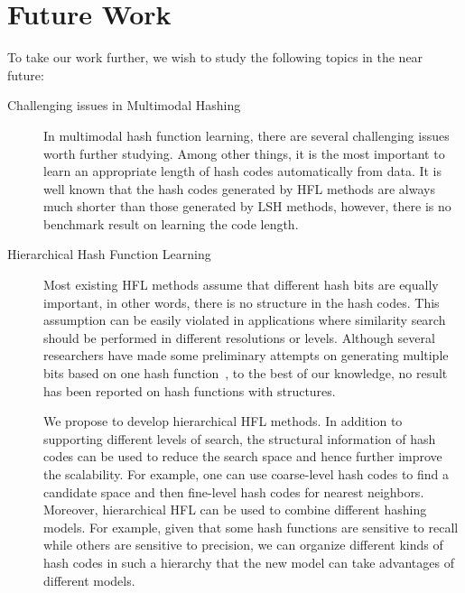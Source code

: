 
\section{Future Work}


To take our work further, we wish to study the following topics in the near future:

\begin{description}
\item[Challenging issues in Multimodal Hashing] In multimodal hash function learning, there are several challenging issues worth further studying. Among other things, it is the most important to learn an appropriate length of hash codes automatically from data. It is well known that the hash codes generated by HFL methods are always much shorter than those generated by LSH methods, however, there is no benchmark result on learning the code length. %

\item[Hierarchical Hash Function Learning] Most existing \mbox{HFL} methods assume that different hash bits are equally important, in other words, there is no structure in the hash codes. This assumption can be easily violated in applications where similarity search should be performed in different resolutions or levels. Although several researchers have made some preliminary attempts on generating multiple bits based on one hash function~\cite{liu2011icml}, to the best of our knowledge, no result has been reported on hash functions with structures.

We propose to develop hierarchical \mbox{HFL} methods. In addition to supporting different levels of search, the structural information of hash codes can be used to reduce the search space and hence further improve the scalability. For example, one can use coarse-level hash codes to find a candidate space and then fine-level hash codes for nearest neighbors. Moreover, hierarchical \mbox{HFL} can be used to combine different hashing models. For example, given that some hash functions are sensitive to recall while others are sensitive to precision, we can organize different kinds of hash codes in such a hierarchy that the new model can take advantages of different models.


\end{description}

